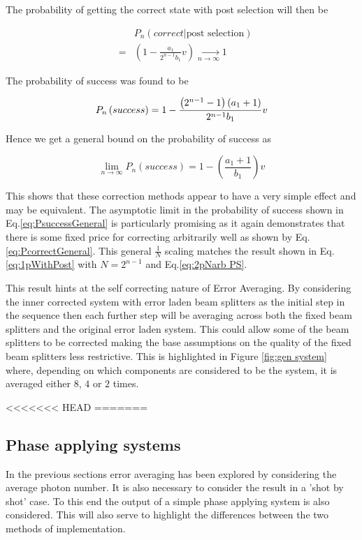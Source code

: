\documentclass[aps,pra,twocolumn,superscriptaddress,numerical]{revtex4-1}
\begin{document}
		The probability of getting the correct state with post selection will then be
			
		\begin{eqnarray}
			&  & P_{n}\left(correct\left|\textrm{post selection}\right.\right)\nonumber \\
			& = & \left(1-\frac{a_{1}}{2^{n-1}b_{1}}v\right)\xrightarrow[n\rightarrow\infty]{}1\label{eq:PcorrectGeneral}
		\end{eqnarray}
				
		The probability of success was found to be
			
		\begin{equation}
			P_{n}\left(success\right) =  1-\frac{\left(2^{n-1}-1\right)\left(a_{1}+1\right)}{2^{n-1}b_{1}}v\nonumber \\
		\end{equation}
			
		Hence we get a general bound on the probability of success as
			
		\begin{equation}
			\lim_{n\rightarrow\infty}P_{n}\left(success\right)=1-\left(\frac{a_{1}+1}{b_{1}}\right)v\label{eq:PsuccessGeneral}
		\end{equation}	
			
		This shows that these correction methods appear to have a very simple effect and may be equivalent. The asymptotic limit in the probability	of success shown in Eq.\ref{eq:PsuccessGeneral} is particularly promising as it again demonstrates that there is some fixed price for correcting arbitrarily well as shown by Eq.\ref{eq:PcorrectGeneral}. This general $\frac{1}{N}$ scaling matches the result shown in Eq.\ref{eq:1pWithPost} with $N=2^{n-1}$ and Eq.\ref{eq:2pNarb PS}.
			
		This result hints at the self correcting nature of Error Averaging. By considering the inner corrected system with error laden beam splitters as the initial step in the sequence then each further step will be averaging across both the fixed beam splitters and the original error laden system. This could allow some of the beam splitters to be corrected  making the base assumptions on the quality of the fixed beam splitters less restrictive. This is highlighted in Figure \ref{fig:gen system} where, depending on which components are considered to be the system, it is averaged either $8$, $4$ or $2$ times. 
		
<<<<<<< HEAD
=======
	
	\subsection{Phase applying systems\label{Phase applying systems}}
		In the previous sections error averaging has been explored by considering the average photon number. It is also necessary to consider the result in a 'shot by shot' case. To this end the output of a simple phase applying system is also considered. This will also serve to highlight the differences between the two methods of implementation.
		
\end{document}
